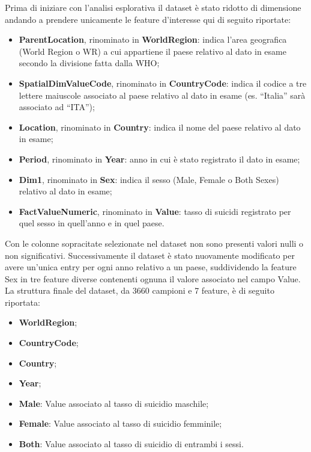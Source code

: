 \documentclass[conference]{IEEEtran}
\begin{document}
Prima di iniziare con l'analisi esplorativa il dataset è stato ridotto di
dimensione andando a prendere unicamente le feature d'interesse qui di seguito
riportate:
\begin{itemize}
    \item \textbf{ParentLocation}, rinominato in \textbf{WorldRegion}: 
    indica l'area geografica (World Region o WR) a cui appartiene il paese relativo al dato
    in esame secondo la divisione fatta dalla WHO;
    \item \textbf{SpatialDimValueCode}, rinominato in \textbf{CountryCode}: 
    indica il codice a tre lettere maiuscole associato al paese relativo
    al dato in esame (es. ``Italia'' sarà associato ad ``ITA'');
    \item \textbf{Location}, rinominato in \textbf{Country}: 
    indica il nome del paese  relativo al dato in esame;
    \item \textbf{Period}, rinominato in \textbf{Year}: 
    anno in cui è stato registrato il dato in esame;
    \item \textbf{Dim1}, rinominato in \textbf{Sex}: 
    indica il sesso (Male, Female o Both Sexes)
    relativo al dato in esame;
    \item \textbf{FactValueNumeric}, rinominato in \textbf{Value}: 
    tasso di suicidi registrato per quel sesso in quell'anno e in quel paese.
\end{itemize}
Con le colonne sopracitate selezionate nel dataset non sono presenti
valori nulli o non significativi.
Successivamente il dataset è stato nuovamente modificato per
avere un'unica entry per ogni anno relativo a un paese, suddividendo la feature Sex
in tre feature diverse contenenti ognuna il valore associato nel campo Value.
La struttura finale del dataset, da 3660 campioni e 7 feature, è di seguito riportata:
\begin{itemize}
    \item \textbf{WorldRegion};
    \item \textbf{CountryCode};
    \item \textbf{Country};
    \item \textbf{Year};
    \item \textbf{Male}: Value associato al tasso di suicidio maschile;
    \item \textbf{Female}: Value associato al tasso di suicidio femminile;
    \item \textbf{Both}: Value associato al tasso di suicidio di entrambi i sessi.
\end{itemize}
\end{document}
